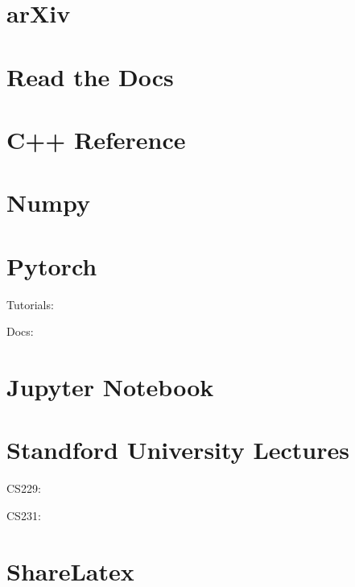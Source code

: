 \documentclass[letterpaper,10pt,english]{sphinxmanual}
\begin{document}
\section{arXiv}
\label{\detokenize{link/index:arxiv}}


\section{Read the Docs}
\label{\detokenize{link/index:read-the-docs}}


\section{C++ Reference}
\label{\detokenize{link/index:c-reference}}


\section{Numpy}
\label{\detokenize{link/index:numpy}}


\section{Pytorch}
\label{\detokenize{link/index:pytorch}}
Tutorials: 

Docs: 


\section{Jupyter Notebook}
\label{\detokenize{link/index:jupyter-notebook}}


\section{Standford University Lectures}
\label{\detokenize{link/index:standford-university-lectures}}
CS229: 

CS231: 


\section{ShareLatex}
\label{\detokenize{link/index:sharelatex}}
\end{document}
